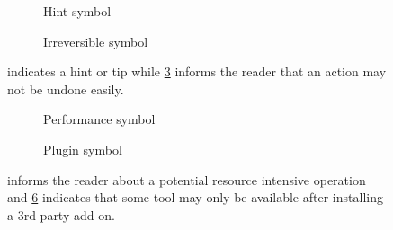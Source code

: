\begin{figure}[h!]
	\begin{centering}
		\begin{subfigure}{0.5\textwidth}
			
			\caption{Hint symbol}\label{fig:hint_icon}
		\end{subfigure}
		\begin{subfigure}{0.5\textwidth}
			
			\caption{Irreversible symbol}\label{fig:noundo_icon}
		\end{subfigure}
	\end{centering}
	\caption{ indicates a hint or tip while \cref{fig:noundo_icon} informs the reader that an action may not be undone easily.}
\end{figure}

\begin{figure}[h!]
	\begin{centering}
		\begin{subfigure}{0.5\textwidth}
			
			\caption{Performance symbol}\label{fig:performance_icon}
		\end{subfigure}
		\begin{subfigure}{0.5\textwidth}
			
			\caption{Plugin symbol}\label{fig:plugin_icon}
		\end{subfigure}
	\end{centering}
	\caption{ informs the reader about a potential resource intensive operation and \cref{fig:plugin_icon} indicates that some tool may only be available after installing a 3rd party add-on.}
\end{figure}
\pagebreak

